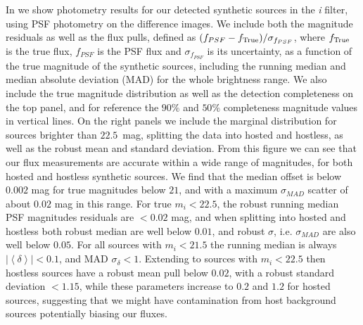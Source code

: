 %
In  we show photometry results for our detected synthetic sources in the \textit{i} filter, using \gls{PSF} photometry on the difference images. 
We include both the magnitude residuals as well as the flux pulls, defined as $(f_{PSF}-f_{\rm{True}})/\sigma_{f_{PSF}}$, where $f_{\rm True}$ is the true flux, $f_{PSF}$ is the PSF flux and $\sigma_{f_{PSF}}$ is its uncertainty, as a function of the true magnitude of the synthetic sources, including the running median and median absolute deviation (MAD) for the whole brightness range. 
We also include the true magnitude distribution as well as the detection completeness on the top panel, and for reference the $90\%$ and $50\%$ completeness magnitude values in vertical lines. 
On the right panels we include the marginal distribution for sources brighter than $22.5$~mag, splitting the data into hosted and hostless, as well as the robust mean and standard deviation.
%
From this figure we can see that our \gls{flux} measurements are accurate within a wide range of magnitudes, for both hosted and hostless synthetic sources. 
We find that the median offset is below $0.002$ mag for true magnitudes below $21$, and with a maximum $\sigma_{MAD}$ scatter of about $0.02$ mag in this range.
For true $m_i < 22.5$, the robust running median PSF magnitudes residuals are $<0.02$ mag, and when splitting into hosted and hostless both robust median are well below $0.01$, and robust $\sigma$, i.e. $\sigma_{MAD}$ are also well below $0.05$.
%
For all sources with $m_i<21.5$ the running median is always $|\left<\delta\right>| <0.1$, and MAD $\sigma_\delta < 1$. 
Extending to sources with $m_i<22.5$ then  hostless sources have  a robust mean pull below $0.02$, with a robust standard deviation $<1.15$, while these parameters increase to $0.2$ and $1.2$ for hosted sources, suggesting that we might have contamination from host background sources potentially biasing our fluxes.
%
